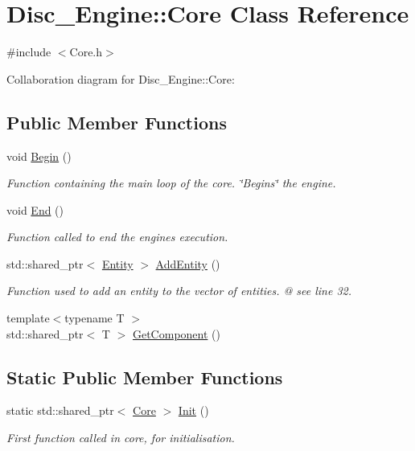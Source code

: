 \hypertarget{class_disc___engine_1_1_core}{}\section{Disc\+\_\+\+Engine\+:\+:Core Class Reference}
\label{class_disc___engine_1_1_core}


{\ttfamily \#include $<$Core.\+h$>$}



Collaboration diagram for Disc\+\_\+\+Engine\+:\+:Core\+:
\subsection*{Public Member Functions}
\begin{DoxyCompactItemize}
\item 
void \mbox{\hyperlink{class_disc___engine_1_1_core_a80e509698ac326255a17b7fff33f2f92}{Begin}} ()
\begin{DoxyCompactList}\small\item\em Function containing the main loop of the core. \char`\"{}\+Begins\char`\"{} the engine. \end{DoxyCompactList}\item 
void \mbox{\hyperlink{class_disc___engine_1_1_core_a247c426bb4f51c0caa406bccb85d7d3c}{End}} ()
\begin{DoxyCompactList}\small\item\em Function called to end the engine\textquotesingle{}s execution. \end{DoxyCompactList}\item 
std\+::shared\+\_\+ptr$<$ \mbox{\hyperlink{class_disc___engine_1_1_entity}{Entity}} $>$ \mbox{\hyperlink{class_disc___engine_1_1_core_a6cd7b26cd56b4a42da9ae8826de0df17}{Add\+Entity}} ()
\begin{DoxyCompactList}\small\item\em Function used to add an entity to the vector of entities. @ see line 32. \end{DoxyCompactList}\item 
{\footnotesize template$<$typename T $>$ }\\std\+::shared\+\_\+ptr$<$ T $>$ \mbox{\hyperlink{class_disc___engine_1_1_core_a74c28b745ea29cd2dab65a14c7eb08b4}{Get\+Component}} ()
\end{DoxyCompactItemize}
\subsection*{Static Public Member Functions}
\begin{DoxyCompactItemize}
\item 
static std\+::shared\+\_\+ptr$<$ \mbox{\hyperlink{class_disc___engine_1_1_core}{Core}} $>$ \mbox{\hyperlink{class_disc___engine_1_1_core_a4c071496806fdf473780da441945518e}{Init}} ()
\begin{DoxyCompactList}\small\item\em First function called in core, for initialisation. \end{DoxyCompactList}\end{DoxyCompactItemize}
